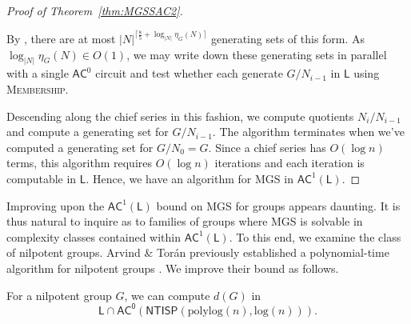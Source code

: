 \documentclass{theoretics}
\newcommand{\algprobm}[1]{\textsc{#1}\xspace}
\newcommand*{\ComplexityClass}[1]{\ensuremath{\mathsf{#1}}\xspace}
\newcommand{\NTISP}{\ComplexityClass{NTISP}}
\newcommand{\NTISPpll}{\ensuremath{\NTISP(\mathrm{polylog}(n),\mathrm{log}(n))}\xspace}
\newcommand*{\LogSpace}{\ComplexityClass{L}}
\newcommand{\AC}{\ComplexityClass{AC}}
\newcommand{\ACz}{\ComplexityClass{AC^0}}
\begin{document}
\begin{proof}[Proof of Theorem~\ref{thm:MGSSAC2}]
\begin{itemize}
By \cite[Corollary 13]{LucchiniThakkar}, there are at most $\lvert N \rvert ^{\lceil \frac{8}{5} + \log_{\lvert N \rvert}\eta_G(N)  \rceil }$ generating sets of this form. As $\log_{|N|} \eta_{G}(N) \in O(1)$, we may write down these generating sets in parallel with a single $\AC^0$ circuit and test whether each generate $G/N_{i-1}$ in $\LogSpace$ using \algprobm{Membership}.
\end{itemize}

\noindent Descending along the chief series in this fashion, we compute quotients $N_i / N_{i-1}$ and compute a generating set for $G/N_{i-1}$. The algorithm terminates when we've computed a generating set for $G/N_0 = G$. Since a chief series has $O(\log n)$ terms, this algorithm requires $O(\log n)$ iterations and each iteration is computable in $\LogSpace$. Hence, we have an algorithm for \algprobm{MGS} in $\AC^1(\LogSpace)$.
\end{proof}


Improving upon the $\AC^{1}(\LogSpace)$ bound on \algprobm{MGS} for groups appears daunting. It is thus natural to inquire as to families of groups where \algprobm{MGS} is solvable in complexity classes contained within $\AC^{1}(\LogSpace)$. To this end, we examine the class of nilpotent groups. Arvind \& Tor\'an previously established a polynomial-time algorithm for nilpotent groups \cite[Theorem~7]{ArvindToran}. We improve their bound as follows.

\begin{proposition} \label{prop:Nilpotent}
For a nilpotent group $G$, we can compute $d(G)$ in
\[
\LogSpace \cap \ACz(\NTISPpll).
\]
\end{proposition}
\end{document}
